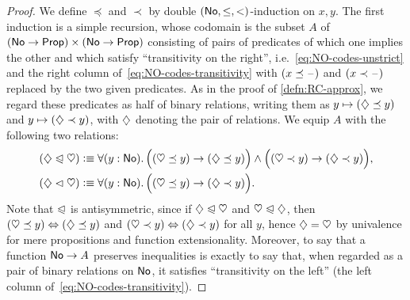 \begin{proof}
  We define $\preceq$ and $\prec$ by double $(\mathsf{No},\le,<)$-induction on $x,y$.
  The first induction is a simple recursion, whose codomain is the subset $A$ of $(\mathsf{No}\to\mathsf{Prop})\times (\mathsf{No}\to\mathsf{Prop})$ consisting of pairs of predicates of which one implies the other and which satisfy ``transitivity on the right'', i.e.~\eqref{eq:NO-codes-unstrict} and the right column of~\eqref{eq:NO-codes-transitivity} with $(x\preceq \mathord{\hspace{1pt}\text{--}\hspace{1pt}})$ and $(x\prec \mathord{\hspace{1pt}\text{--}\hspace{1pt}})$ replaced by the two given predicates.
  As in the proof of \cref{defn:RC-approx}, we regard these predicates as half of binary relations, writing them as $y\mapsto (\diamondsuit\preceq y)$ and $y\mapsto (\diamondsuit\prec y)$, with $\diamondsuit$ denoting the pair of relations.
  We equip $A$ with the following two relations:
  \begin{align*}
    (\hlname \ble \hlbname) &\defeq
    \fall{y:\NO} \Big( (\hleb y) \to (\hle y) \Big) \land
    \Big( (\hltb y) \to (\hlt y) \Big),\\
    (\hlname \blt \hlbname) &\defeq
    \fall{y:\NO} \Big( (\hleb y) \to (\hlt y) \Big).
  \end{align*}
  Note that $\trianglelefteqslant$ is antisymmetric, since if $\diamondsuit \trianglelefteqslant \heartsuit$ and $\heartsuit \trianglelefteqslant \diamondsuit$, then $(\heartsuit\preceq y) \Leftrightarrow (\diamondsuit\preceq y)$ and $(\heartsuit\prec y) \Leftrightarrow (\diamondsuit\prec y)$ for all $y$, hence $\diamondsuit=\heartsuit$ by univalence for mere propositions and function extensionality.
  Moreover, to say that a function $\mathsf{No}\to A$ preserves inequalities is exactly to say that, when regarded as a pair of binary relations on $\mathsf{No}$, it satisfies ``transitivity on the left'' (the left column of~\eqref{eq:NO-codes-transitivity}).


\end{proof}
